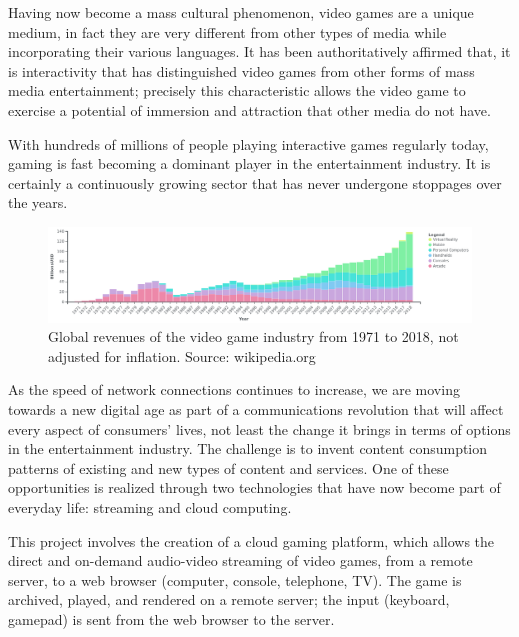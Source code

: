 %
%

Having now become a mass cultural phenomenon, video games are a unique medium, in fact they are very different from other types of media while incorporating their various languages. It has been authoritatively affirmed that, it is interactivity that has distinguished video games from other forms of mass media entertainment; precisely this characteristic allows the video game to exercise a potential of immersion and attraction that other media do not have.

With hundreds of millions of people playing interactive games regularly today, gaming is fast becoming a dominant player in the entertainment industry.	It is certainly a continuously growing sector that has never undergone stoppages over the years.

\begin{figure}[H]
	\includegraphics[width=\linewidth]{immagini/valore_commerciale_giochi_globale.png}
	\caption{Global revenues of the video game industry from 1971 to 2018, not adjusted for inflation. Source: wikipedia.org}
	\label{fig:valore_commerciale_giochi_globale}
\end{figure}

As the speed of network connections continues to increase, we are moving towards a new digital age as part of a communications revolution that will affect every aspect of consumers' lives, not least the change it brings in terms of options in the entertainment industry. The challenge is to invent content consumption patterns of existing and new types of content and services. One of these opportunities is realized through two technologies that have now become part of everyday life: streaming and cloud computing.

This project involves the creation of a cloud gaming platform, which allows the direct and on-demand audio-video streaming of video games, from a remote server, to a web browser (computer, console, telephone, TV). The game is archived, played, and rendered on a remote server; the input (keyboard, gamepad) is sent from the web browser to the server.

